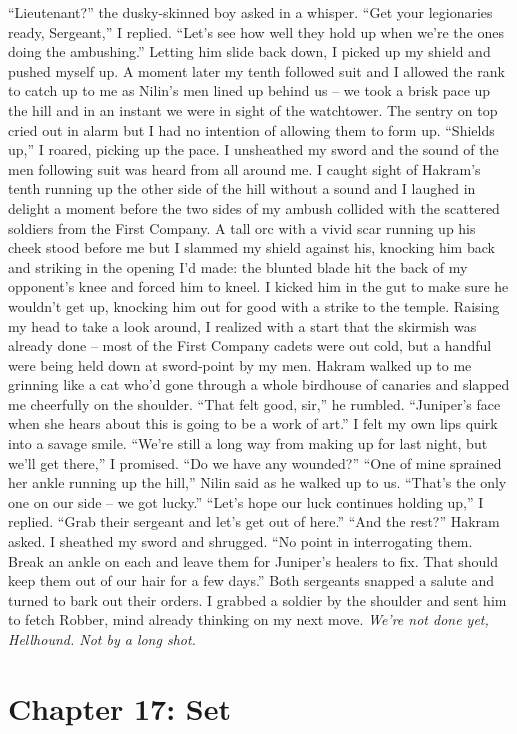 \documentclass[12pt, openany]{book}
\begin{document}
“Lieutenant?” the dusky-skinned boy asked in a whisper.
“Get your legionaries ready, Sergeant,” I replied. “Let’s see how well they hold up when we’re the ones doing the ambushing.”
Letting him slide back down, I picked up my shield and pushed myself up. A moment later my tenth followed suit and I allowed the rank to catch up to me as Nilin’s men lined up behind us – we took a brisk pace up the hill and in an instant we were in sight of the watchtower. The sentry on top cried out in alarm but I had no intention of allowing them to form up.
“Shields up,” I roared, picking up the pace.
I unsheathed my sword and the sound of the men following suit was heard from all around me. I caught sight of Hakram’s tenth running up the other side of the hill without a sound and I laughed in delight a moment before the two sides of my ambush collided with the scattered soldiers from the First Company. A tall orc with a vivid scar running up his cheek stood before me but I slammed my shield against his, knocking him back and striking in the opening I’d made: the blunted blade hit the back of my opponent’s knee and forced him to kneel. I kicked him in the gut to make sure he wouldn’t get up, knocking him out for good with a strike to the temple. Raising my head to take a look around, I realized with a start that the skirmish was already done – most of the First Company cadets were out cold, but a handful were being held down at sword-point by my men. Hakram walked up to me grinning like a cat who’d gone through a whole birdhouse of canaries and slapped me cheerfully on the shoulder.
“That felt good, sir,” he rumbled. “Juniper’s face when she hears about this is going to be a work of art.”
I felt my own lips quirk into a savage smile.
“We’re still a long way from making up for last night, but we’ll get there,” I promised. “Do we have any wounded?”
“One of mine sprained her ankle running up the hill,” Nilin said as he walked up to us. “That’s the only one on our side – we got lucky.”
“Let’s hope our luck continues holding up,” I replied. “Grab their sergeant and let’s get out of here.”
“And the rest?” Hakram asked.
I sheathed my sword and shrugged.
“No point in interrogating them. Break an ankle on each and leave them for Juniper’s healers to fix. That should keep them out of our hair for a few days.”
Both sergeants snapped a salute and turned to bark out their orders. I grabbed a soldier by the shoulder and sent him to fetch Robber, mind already thinking on my next move. \textit{We’re not done yet, Hellhound. Not by a long shot.}
\clearpage
\chapter{Chapter 17: Set}
\end{document}
